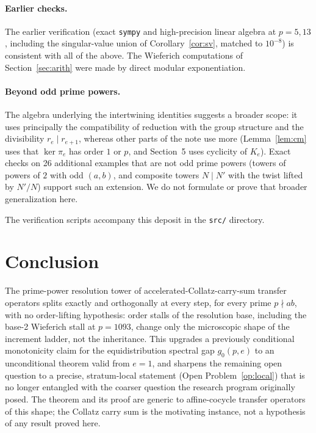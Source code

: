 \documentclass[11pt]{article}
\theoremstyle{definition}
\theoremstyle{remark}
\begin{document}
\paragraph{Earlier checks.}
The earlier verification (exact \texttt{sympy} and high-precision linear algebra at $p=5,13$, including the singular-value union of Corollary~\ref{cor:sv}, matched to $10^{-8}$) is consistent with all of the above. The Wieferich computations of Section~\ref{sec:arith} were made by direct modular exponentiation.

\paragraph{Beyond odd prime powers.}
The algebra underlying the intertwining identities suggests a broader scope: it uses principally the compatibility of reduction with the group structure and the divisibility $r_e\mid r_{e+1}$, whereas other parts of the note use more (Lemma~\ref{lem:cm} uses that $\ker\pi_e$ has order $1$ or $p$, and Section~5 uses cyclicity of $K_e$). Exact checks on 26 additional examples that are not odd prime powers (towers of powers of $2$ with odd $(a,b)$, and composite towers $N\mid N'$ with the twist lifted by $N'/N$) support such an extension. We do not formulate or prove that broader generalization here.

The verification scripts accompany this deposit in the \texttt{src/} directory.

\section{Conclusion}

The prime-power resolution tower of accelerated-Collatz-carry-sum transfer operators splits exactly and orthogonally at every step, for every prime $p\nmid ab$, with no order-lifting hypothesis: order stalls of the resolution base, including the base-2 Wieferich stall at $p=1093$, change only the microscopic shape of the increment ladder, not the inheritance. This upgrades a previously conditional monotonicity claim for the equidistribution spectral gap $g_0(p,e)$ to an unconditional theorem valid from $e=1$, and sharpens the remaining open question to a precise, stratum-local statement (Open Problem~\ref{op:local}) that is no longer entangled with the coarser question the research program originally posed. The theorem and its proof are generic to affine-cocycle transfer operators of this shape; the Collatz carry sum is the motivating instance, not a hypothesis of any result proved here.
\end{document}
